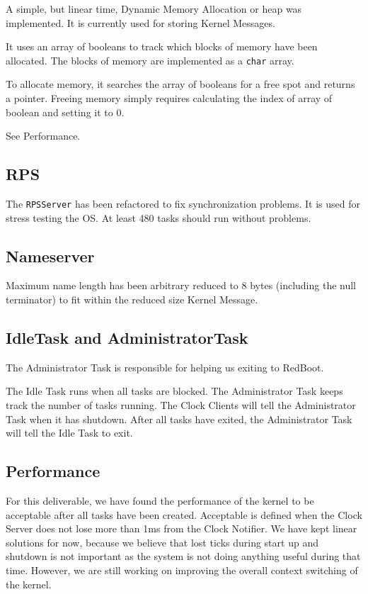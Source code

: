 \documentclass[letterpaper]{article}
\begin{document}
A simple, but linear time, Dynamic Memory Allocation or heap was implemented. It is currently used for storing Kernel Messages.

It uses an array of booleans to track which blocks of memory have been allocated. The blocks of memory are implemented as a \texttt{char} array.

To allocate memory, it searches the array of booleans for a free spot and returns a pointer. Freeing memory simply requires calculating the index of array of boolean and setting it to 0.

See Performance.


\subsection{RPS%
  \label{rps}%
}

The \texttt{RPSServer} has been refactored to fix synchronization problems. It is used for stress testing the OS. At least 480 tasks should run without problems.


\subsection{Nameserver%
  \label{nameserver}%
}

Maximum name length has been arbitrary reduced to 8 bytes (including the null terminator) to fit within the reduced size Kernel Message.


\subsection{IdleTask and AdministratorTask%
  \label{idletask-and-administratortask}%
}

The Administrator Task is responsible for helping us exiting to RedBoot.

The Idle Task runs when all tasks are blocked. The Administrator Task keeps track the number of tasks running. The Clock Clients will tell the Administrator Task when it has shutdown. After all tasks have exited, the Administrator Task will tell the Idle Task to exit.


\subsection{Performance%
  \label{performance}%
}

For this deliverable, we have found the performance of the kernel to be acceptable after all tasks have been created. Acceptable is defined when the Clock Server does not lose more than 1ms from the Clock Notifier. We have kept linear solutions for now, because we believe that lost ticks during start up and shutdown is not important as the system is not doing anything useful during that time. However, we are still working on improving the overall context switching of the kernel.
\end{document}
